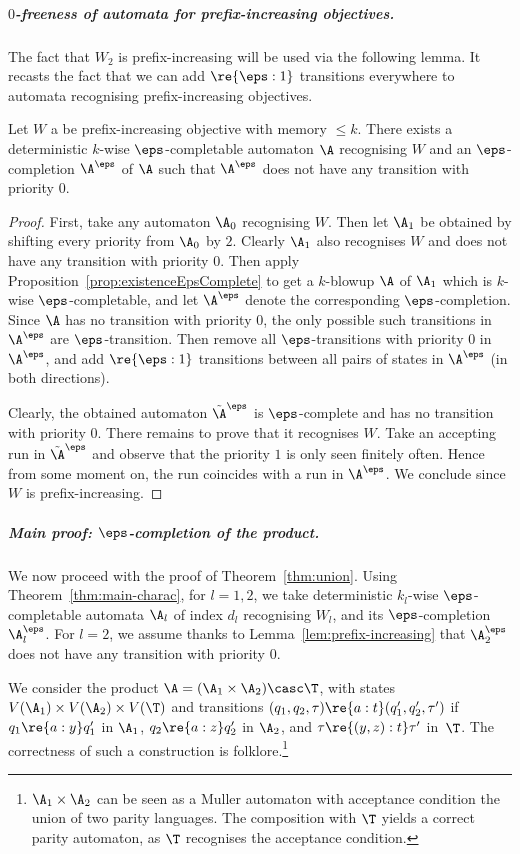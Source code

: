 \subparagraph{$0$-freeness of automata for prefix-increasing objectives.} The fact that $W_2$ is prefix-increasing will be used via the following lemma. It recasts the fact that we can add $\re{\eps:1}$ transitions everywhere to automata recognising prefix-increasing objectives.

\begin{lemma}\label{lem:prefix-increasing}
    Let $W$ a be prefix-increasing objective with memory $\leq k$.
    There exists a deterministic $k$-wise $\eps$-completable automaton $\A$ recognising $W$ and an $\eps$-completion $\A^\eps$ of $\A$ such that $\A^\eps$ does not have any transition with priority $0$.
\end{lemma}

\begin{proof}
    First, take any automaton $\A_0$ recognising $W$.
    Then let $\A_1$ be obtained by shifting every priority from $\A_0$ by $2$.
    Clearly $\A_1$ also recognises $W$ and does not have any transition with priority $0$.
    Then apply Proposition~\ref{prop:existenceEpsComplete} to get a $k$-blowup $\A$ of $\A_1$ which is $k$-wise $\eps$-completable, and let $\A^\eps$ denote the corresponding $\eps$-completion.
    Since $\A$ has no transition with priority $0$, the only possible such transitions in $\A^\eps$ are $\eps$-transition.
    Then remove all $\eps$-transitions with priority $0$ in $\A^\eps$, and add $\re{\eps:1}$ transitions between all pairs of states in $\A^\eps$ (in both directions).

    Clearly, the obtained automaton $\tilde \A^\eps$ is $\eps$-complete and has no transition with priority $0$.
    There remains to prove that it recognises $W$.
    Take an accepting run in $\tilde \A^\eps$ and observe that the priority $1$ is only seen finitely often.
    Hence from some moment on, the run coincides with a run in $\A^\eps$.
    We conclude since $W$ is prefix-increasing.
\end{proof}



\subparagraph{Main proof: $\eps$-completion of the product.}
We now proceed with the proof of Theorem~\ref{thm:union}.
Using Theorem~\ref{thm:main-charac}, for $l =1,2$, we take  deterministic $k_l$-wise $\eps$-completable automata $\A_l$ of index $d_l$ recognising $W_l$, and its $\eps$-completion $\A_{l}^\eps$. 
For $l=2$, we assume thanks to Lemma~\ref{lem:prefix-increasing} that $\A_{2}^\eps$ does not have any transition with priority $0$.


We consider the product $\A=(\A_{1} \times \A_{2}) \casc \T$, with states $V(\A_1) \times V(\A_2) \times V(\T)$ and transitions $(q_1,q_2,\tau) \re{a:t} (q'_1,q'_2,\tau')$ if $q_1\re{a:y}q_1'$ in $\A_1$, $q_2\re{a:z}q_2'$ in $\A_2$, and $\tau \re{(y,z):t} \tau'$ in~$\T$. 
The correctness of such a construction is folklore.\footnote{$\A_1\times \A_2$ can be seen as a Muller automaton with acceptance condition the union of two parity languages. The composition with $\T$ yields a correct parity automaton, as $\T$ recognises the acceptance condition.}


